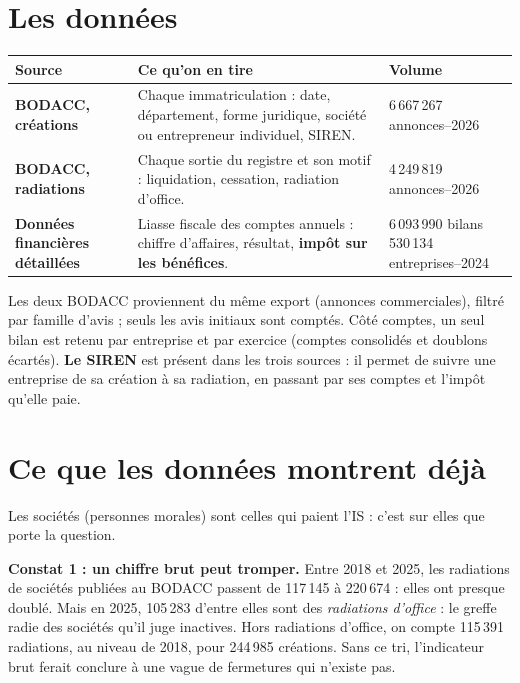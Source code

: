 \documentclass[11pt,a4paper]{article}
\begin{document}
\section{Les données}

\begin{tabularx}{\textwidth}{@{}P{4.2cm}LP{3.6cm}@{}}
\toprule
\textbf{Source} & \textbf{Ce qu'on en tire} & \textbf{Volume} \\
\midrule
\textbf{BODACC, créations} &
  Chaque immatriculation : date, département, forme juridique, société ou entrepreneur individuel, SIREN. &
  6\,667\,267 annonces–2026 \\
\textbf{BODACC, radiations} &
  Chaque sortie du registre et son motif : liquidation, cessation, radiation d'office. &
  4\,249\,819 annonces–2026 \\
\textbf{Données financières détaillées} &
  Liasse fiscale des comptes annuels : chiffre d'affaires, résultat, \textbf{impôt sur les bénéfices}. &
  6\,093\,990 bilans\,530\,134 entreprises–2024 \\
\bottomrule
\end{tabularx}

{\small\color{gris}Les deux BODACC proviennent du même export (annonces commerciales), filtré par famille d'avis ;
seuls les avis initiaux sont comptés. Côté comptes, un seul bilan est retenu par entreprise et par exercice
(comptes consolidés et doublons écartés). \textbf{Le SIREN} est présent dans les trois sources : il permet de suivre
une entreprise de sa création à sa radiation, en passant par ses comptes et l'impôt qu'elle paie.}

\section{Ce que les données montrent déjà}

Les sociétés (personnes morales) sont celles qui paient l'IS : c'est sur elles que porte la question.

\textbf{Constat 1 : un chiffre brut peut tromper.}
Entre 2018 et 2025, les radiations de sociétés publiées au BODACC passent de 117\,145 à 220\,674 : elles ont presque doublé.
Mais en 2025, 105\,283 d'entre elles sont des \emph{radiations d'office} : le greffe radie des sociétés qu'il juge inactives.
Hors radiations d'office, on compte 115\,391 radiations, au niveau de 2018, pour 244\,985 créations.
Sans ce tri, l'indicateur brut ferait conclure à une vague de fermetures qui n'existe pas.
\end{document}
